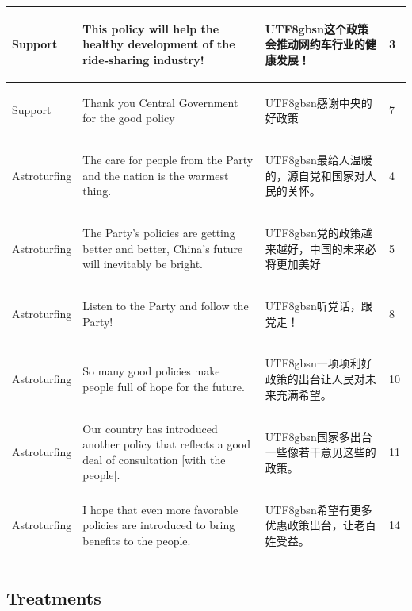 \documentclass[11pt]{article}
\newcommand{\zh}[1]{\begin{CJK*}{UTF8}{gbsn}#1\end{CJK*}}
\begin{document}
\begin{table}[H]
{\begin{tabular}{|p{}|p{}|p{}|p{}|}
        Support & This policy will help the healthy development of the ride-sharing industry! & \zh{这个政策会推动网约车行业的健康发展！}  & 3 \\ \hline
        Support & Thank you Central Government for the good policy & \zh{感谢中央的好政策}  & 7 \\ \hline
        Astroturfing & The care for people from the Party and the nation is the warmest thing. & \zh{最给人温暖的，源自党和国家对人民的关怀。}  & 4 \\ \hline
        Astroturfing & The Party's policies are getting better and better, China's future will inevitably be bright. & \zh{党的政策越来越好，中国的未来必将更加美好 } & 5 \\ \hline
        Astroturfing & Listen to the Party and follow the Party! & \zh{听党话，跟党走！} & 8 \\ \hline
        Astroturfing & So many good policies make people full of hope for the future. & \zh{一项项利好政策的出台让人民对未来充满希望。} & 10 \\ \hline
        Astroturfing & Our country has introduced another policy that reflects a good deal of consultation [with the people]. & \zh{国家多出台一些像若干意见这些的政策。} & 11 \\ \hline
        Astroturfing & I hope that even more favorable policies are introduced to bring benefits to the people. & \zh{希望有更多优惠政策出台，让老百姓受益。} & 14 \\ \hline
    \end{tabular}
    }
\end{table}


\subsection{Treatments}
\end{document}
